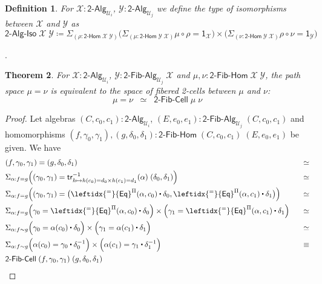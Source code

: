 \documentclass[reqno,10pt,a4paper,oneside]{amsart}
\newcommand{\X}{\mathcal{X}}
\newcommand{\Y}{\mathcal{Y}}
\newcommand{\comp}{\circ}
\newcommand{\sm}[1]{\Sigma_{#1}}
\newcommand{\defeq}{\coloneqq}
\newcommand{\happly}{\leftidx{^=}{\mathsf{Eq}}^{\Pi}}
\newcommand{\one}{\mathsf{1}}
\newcommand{\UU}{\mathcal{U}}
\newcommand{\BoolAlg}{\mathsf{2}\text{-}\mathsf{Alg}}
\newcommand{\BoolHom}{\mathsf{2}\text{-}\mathsf{Hom}}
\newcommand{\BoolFibCell}{\mathsf{2}\text{-}\mathsf{Fib}\text{-}\mathsf{Cell}}
\newcommand{\BoolFibAlg}{\mathsf{2}\text{-}\mathsf{Fib}\text{-}\mathsf{Alg}}
\newcommand{\BoolFibHom}{\mathsf{2}\text{-}\mathsf{Fib}\text{-}\mathsf{Hom}}
\newcommand{\trans}{\mathsf{tr}}
\newcommand{\BoolAlgIso}{\mathsf{2}\text{-}\mathsf{Alg}\text{-}\mathsf{Iso}}
\newcommand{\ct}{%
  \mathchoice{\mathbin{\raisebox{0.5ex}{$\displaystyle\centerdot$}}}%
             {\mathbin{\raisebox{0.5ex}{$\centerdot$}}}%
             {\mathbin{\raisebox{0.25ex}{$\scriptstyle\,\centerdot\,$}}}%
             {\mathbin{\raisebox{0.1ex}{$\scriptscriptstyle\,\centerdot\,$}}}}
\numberwithin{equation}{section}
\theoremstyle{mythm}
\newtheorem{theorem}{Theorem}[section]
\theoremstyle{mydef}
\newtheorem{definition}[theorem]{Definition}
\theoremstyle{myrmk}
\begin{document}
\begin{definition}
For $\X : \BoolAlg_{\UU_i}$, $\Y : \BoolAlg_{\UU_j}$ we define the type of \emph{isomorphisms} between $\X$ and $\Y$ as
\[\BoolAlgIso \; \X \; \Y \defeq \sm{(\rho : \BoolHom \; \X \; \Y)} \Big( \sm{(\mu : \BoolHom \; \Y \; \X)} \mu \comp \rho = \one_\X \Big) \times \Big( \sm{(\nu : \BoolHom \; \Y \; \X)} \rho \comp \nu = \one_\Y \Big) \] 
\end{definition}





.



\begin{theorem}\label{BoolFibHomSpace}
For $\X : \BoolAlg_{\UU_i}$, $\Y : \BoolFibAlg_{\UU_j} \; \X$ and $\mu,\nu : \BoolFibHom \; \X \; \Y$, the path space $\mu = \nu$ is equivalent to the space of fibered 2-cells between $\mu$ and $\nu$:
\[ \mu = \nu \;\; \simeq \;\; \BoolFibCell \; \mu \; \nu \] 
\end{theorem}



\begin{proof}
Let algebras $(C,c_0,c_1) : \BoolAlg_{\UU_i}$, $(E,e_0,e_1) : \BoolFibAlg_{\UU_j} \; (C,c_0,c_1)$ and homomorphisms $(f,\gamma_0,\gamma_1), (g,\delta_0,\delta_1) : \BoolFibHom \; (C,c_0,c_1) \; (E,e_0,e_1)$ be given. We have
\begin{alignat*}{4}
& (f,\gamma_0,\gamma_1) = (g,\delta_0,\delta_1) & \simeq \\
& \sm{\alpha : f = g} \Big((\gamma_0,\gamma_1) = \trans^{-1}_{h \mapsto h(c_0) = d_0 \times h(c_1) = d_1}(\alpha) \; (\delta_0,\delta_1) \Big) & \simeq \\
& \sm{\alpha : f = g} \Big((\gamma_0,\gamma_1) = \big(\happly(\alpha,c_0) \ct \delta_0, \happly(\alpha,c_1) \ct \delta_1\big) \Big) & \simeq \\
& \sm{\alpha : f = g} \Big(\gamma_0 = \happly(\alpha,c_0) \ct \delta_0\Big) \times \Big( \gamma_1 = \happly(\alpha,c_1) \ct \delta_1 \Big) & \;\;\; \simeq \\
& \sm{\alpha : f \sim g} \Big(\gamma_0 = \alpha(c_0) \ct \delta_0\Big) \times \Big(\gamma_1 = \alpha(c_1) \ct \delta_1 \Big) & \simeq \\
& \sm{\alpha : f \sim g} \Big(\alpha(c_0) = \gamma_0 \ct \delta^{-1}_0\Big) \times \Big(\alpha(c_1) = \gamma_1 \ct \delta^{-1}_1 \Big) & \equiv \\
& \BoolFibCell \; (f,\gamma_0,\gamma_1) \; (g,\delta_0,\delta_1)
\end{alignat*}
\end{proof}
\end{document}
